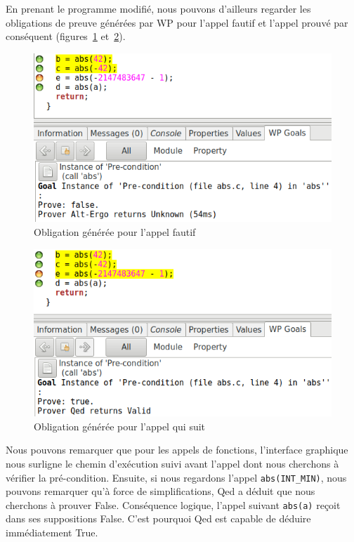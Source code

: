 \documentclass[12pt,francais,]{scrbook}
\begin{document}
En prenant le programme modifié, nous pouvons d'ailleurs regarder les
obligations de preuve générées par WP pour l'appel fautif et l'appel
prouvé par conséquent (figures~\ref{fig:2-1-2-foo-2} et~\ref{fig:2-1-2-foo-3}).

\begin{figure}[htbp]
\centering
\includegraphics[scale=0.5]{2-1-2-foo-2.png}
\caption{Obligation générée pour l'appel fautif}
\label{fig:2-1-2-foo-2}
\end{figure}

\begin{figure}[htbp]
\centering
\includegraphics[scale=0.5]{2-1-2-foo-3.png}
\caption{Obligation générée pour l'appel qui suit}
\label{fig:2-1-2-foo-3}
\end{figure}

Nous pouvons remarquer que pour les appels de fonctions, l'interface
graphique nous surligne le chemin d'exécution suivi avant l'appel dont
nous cherchons à vérifier la pré-condition. Ensuite, si nous regardons
l'appel \texttt{abs(INT\_MIN)}, nous pouvons remarquer qu'à force de
simplifications, Qed a déduit que nous cherchons à prouver \og{}False\fg{}.
Conséquence logique, l'appel suivant \texttt{abs(a)} reçoit dans ses
suppositions \og{}False\fg{}. C'est pourquoi Qed est capable de déduire
immédiatement \og{}True\fg{}.
\end{document}
